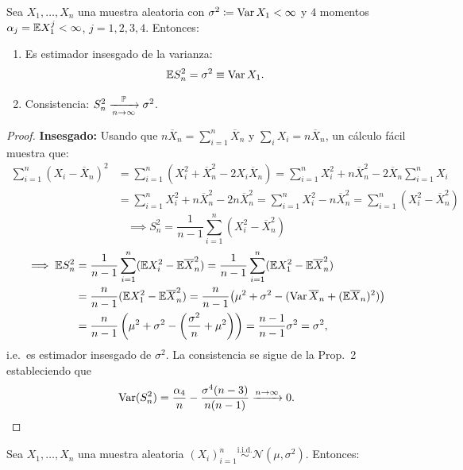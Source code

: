 \textcolor{azulresalt}{
\begin{proposicion}
Sea $X_1, \dots, X_n$ una muestra aleatoria con $\sigma^2 \coloneqq \operatorname{Var} X_1 < \infty$ y $4$ momentos $\alpha_j = \mathbb{E} X_1^j < \infty$, $j = 1, 2, 3, 4$. Entonces:
\begin{enumerate}
  \item Es estimador insesgado de la varianza:
        \[
          \mathbb{E} S_n^2 = \sigma^2 \equiv \operatorname{Var} X_1.
        \]
  \item Consistencia: $S_n^2 \xrightarrow[n\to\infty]{\mathbb{P}} \sigma^2$.
\end{enumerate}
\end{proposicion}
\begin{proof}
\textbf{Insesgado:} Usando que $n\overline{X}_n = \sum_{i=1}^n \overline{X}_n$ y $\sum_i X_i = n\overline{X}_n$, un cálculo fácil muestra que:
\begin{align*}
  \sum_{i=1}^n (X_i - \overline{X}_n)^2 &= \sum_{i=1}^n (X_i^2 + \overline{X}_n^2 - 2X_i\overline{X}_n) = \sum_{i=1}^n X_i^2 + n\overline{X}_n^2 - 2\overline{X}_n\sum_{i=1}^n X_i \\
                                       &= \sum_{i=1}^n X_i^2 + n\overline{X}_n^2 - 2n\overline{X}_n^2 = \sum_{i=1}^n X_i^2 - n\overline{X}_n^2 = \sum_{i=1}^n (X_i^2 - \overline{X}_n^2)
\end{align*}
\[
  \implies S_n^2 = \frac{1}{n-1}\sum_{i=1}^n (X_i^2 - \overline{X}_n^2)
\]
\begin{align*}
  \implies \mathbb{E} S_n^2 &= \frac{1}{n-1}\sum_{i=1}^n (\mathbb{E} X_i^2 - \mathbb{E}\overline{X}_n^2) = \frac{1}{n-1}\sum_{i=1}^n (\mathbb{E} X_1^2 - \mathbb{E}\overline{X}_n^2) \\
                    &= \frac{n}{n-1}(\mathbb{E} X_1^2 - \mathbb{E}\overline{X}_n^2) = \frac{n}{n-1}\bigl(\mu^2 + \sigma^2 - (\operatorname{Var}\overline{X}_n + (\mathbb{E}\overline{X}_n)^2)\bigr) \\
                    &= \frac{n}{n-1}\left(\mu^2 + \sigma^2 - \left(\frac{\sigma^2}{n} + \mu^2\right)\right) = \frac{n-1}{n-1}\sigma^2 = \sigma^2,
\end{align*}
i.e.\ es estimador insesgado de $\sigma^2$. La consistencia se sigue de la Prop.\ 2 estableciendo que
\[
  \operatorname{Var}(S_n^2) = \frac{\alpha_4}{n} - \frac{\sigma^4(n-3)}{n(n-1)} \xrightarrow{n\to\infty} 0.
\]
\end{proof}
\begin{teorema}[1 — de Fisher]
Sea $X_1, \dots, X_n$ una muestra aleatoria $(X_i)_{i=1}^n \stackrel{\text{i.i.d.}}{\sim} \mathcal{N}(\mu, \sigma^2)$. Entonces:

\end{teorema}}
